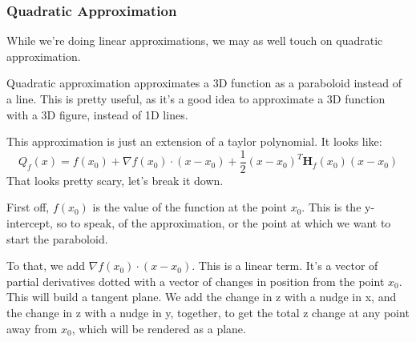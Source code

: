 \documentclass[12pt, letterpaper]{article}
\begin{document}
\subsubsection{Quadratic Approximation}
While we're doing linear approximations, we may as well touch on quadratic approximation.

Quadratic approximation approximates a 3D function as a paraboloid instead of a line. This is pretty useful, as it's a good idea to approximate a 3D function with a 3D figure, instead of 1D lines.

This approximation is just an extension of a taylor polynomial. It looks like:
\begin{displaymath}
    Q_f(x) = f(x_0) + \nabla f(x_0)\cdot(x-x_0)+\frac{1}{2}(x-x_0)^T\mathbf{H}_f(x_0)(x-x_0)
\end{displaymath}
That looks pretty scary, let's break it down.

First off, $f(x_0)$ is the value of the function at the point $x_0$. This is the y-intercept, so to speak, of the approximation, or the point at which we want to start the paraboloid.

To that, we add $\nabla f(x_0)\cdot(x-x_0)$. This is a linear term. It's a vector of partial derivatives dotted with a vector of changes in position from the point $x_0$. This will build a tangent plane. We add the change in z with a nudge in x, and the change in z with a nudge in y, together, to get the total z change at any point away from $x_0$, which will be rendered as a plane.
\end{document}
